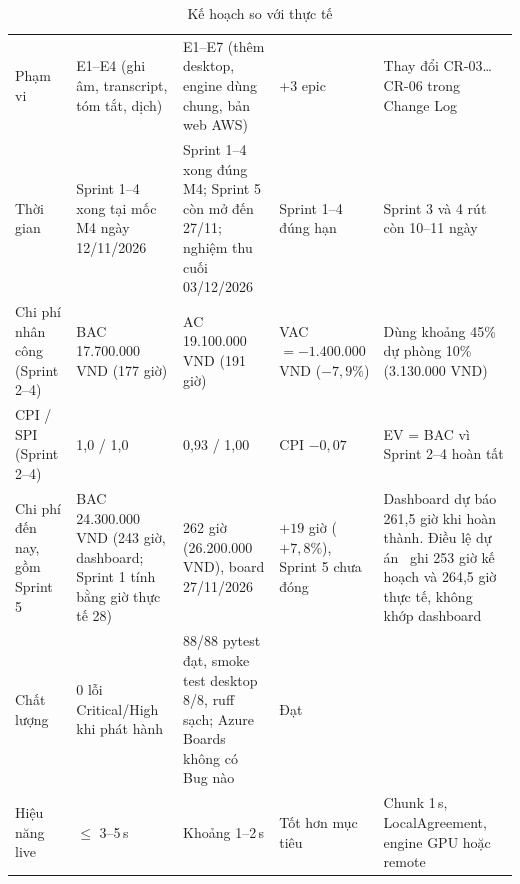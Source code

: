 \documentclass[12pt,a4paper]{report}
\begin{document}
\begin{table}[htbp]
  \centering
  \caption{Kế hoạch so với thực tế}
  \label{tab:plan-actual}
  \small
  \setlength{\tabcolsep}{4pt}
  \begin{tabularx}{\linewidth}{@{}P{2.4cm}P{2.9cm}P{2.9cm}P{1.9cm}L@{}}
    \toprule
     &  &  &  &  \\
    \midrule
    Phạm vi & E1--E4 (ghi âm, transcript, tóm tắt, dịch) & E1--E7 (thêm desktop, engine dùng chung, bản web AWS)
      & +3 epic & Thay đổi CR-03\ldots CR-06 trong Change Log~\cite{mcr} \\
    Thời gian & Sprint 1--4 xong tại mốc M4 ngày 12/11/2026 & Sprint 1--4 xong đúng M4; Sprint 5 còn mở đến 27/11;
      nghiệm thu cuối 03/12/2026 & Sprint 1--4 đúng hạn & Sprint 3 và 4 rút còn 10--11 ngày \\
    Chi phí nhân công (Sprint 2--4) & BAC 17.700.000 VND (177 giờ) & AC 19.100.000 VND (191 giờ) & VAC $=
      -1.400.000$ VND ($-7{,}9\%$) & Dùng khoảng 45\% dự phòng 10\% (3.130.000 VND) \\
    CPI / SPI (Sprint 2--4) & 1,0 / 1,0 & 0,93 / 1,00 & CPI $-0{,}07$ & EV = BAC vì Sprint 2--4 hoàn tất \\
    Chi phí đến nay, gồm Sprint 5 & BAC 24.300.000 VND (243 giờ, dashboard; Sprint 1 tính bằng giờ thực tế 28) & 262 giờ (26.200.000 VND), board 27/11/2026
      & $+19$ giờ ($+7{,}8\%$), Sprint 5 chưa đóng & Dashboard dự báo 261,5 giờ khi hoàn thành. Điều lệ dự án~\cite{pid}
      ghi 253 giờ kế hoạch và 264,5 giờ thực tế, không khớp dashboard \\
    Chất lượng & 0 lỗi Critical/High khi phát hành & 88/88 pytest đạt, smoke test desktop 8/8, ruff sạch; Azure
      Boards không có Bug nào & Đạt & \\
    Hiệu năng live & $\leq$ 3--5\,s & Khoảng 1--2\,s & Tốt hơn mục tiêu & Chunk 1\,s, LocalAgreement, engine GPU
      hoặc remote \\
    \bottomrule
  \end{tabularx}
\end{table}
\end{document}
